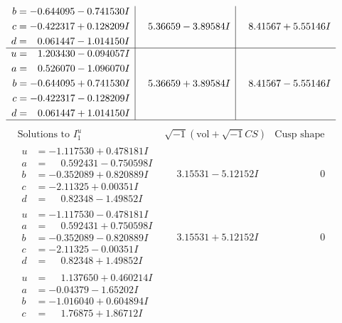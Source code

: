 \documentclass[1p]{elsarticle_modified}
\theoremstyle{definition}
\newcommand{\I}{\sqrt{-1}}
\begin{document}
$$\begin{array}{c|c|c}
\begin{aligned}
b &= -0.644095 - 0.741530 I \\
c &= -0.422317 + 0.128209 I \\
d &= \phantom{-}0.061447 - 1.014150 I\end{aligned}
 & \phantom{-}5.36659 - 3.89584 I & \phantom{-}8.41567 + 5.55146 I \\ \hline\begin{aligned}
u &= \phantom{-}1.203430 - 0.094057 I \\
a &= \phantom{-}0.526070 - 1.096070 I \\
b &= -0.644095 + 0.741530 I \\
c &= -0.422317 - 0.128209 I \\
d &= \phantom{-}0.061447 + 1.014150 I\end{aligned}
 & \phantom{-}5.36659 + 3.89584 I & \phantom{-}8.41567 - 5.55146 I\\
 \hline 
 \end{array}$$\newpage$$\begin{array}{c|c|c}  
\text{Solutions to }I^u_{1}& \I (\text{vol} + \sqrt{-1}CS) & \text{Cusp shape}\\
 \hline 
\begin{aligned}
u &= -1.117530 + 0.478181 I \\
a &= \phantom{-}0.592431 - 0.750598 I \\
b &= -0.352089 + 0.820889 I \\
c &= -2.11325 + 0.00351 I \\
d &= \phantom{-}0.82348 - 1.49852 I\end{aligned}
 & \phantom{-}3.15531 - 5.12152 I & \phantom{-0.000000 } 0 \\ \hline\begin{aligned}
u &= -1.117530 - 0.478181 I \\
a &= \phantom{-}0.592431 + 0.750598 I \\
b &= -0.352089 - 0.820889 I \\
c &= -2.11325 - 0.00351 I \\
d &= \phantom{-}0.82348 + 1.49852 I\end{aligned}
 & \phantom{-}3.15531 + 5.12152 I & \phantom{-0.000000 } 0 \\ \hline\begin{aligned}
u &= \phantom{-}1.137650 + 0.460214 I \\
a &= -0.04379 - 1.65202 I \\
b &= -1.016040 + 0.604894 I \\
c &= \phantom{-}1.76875 + 1.86712 I \\

\end{aligned}
\end{array}$$
\end{document}
